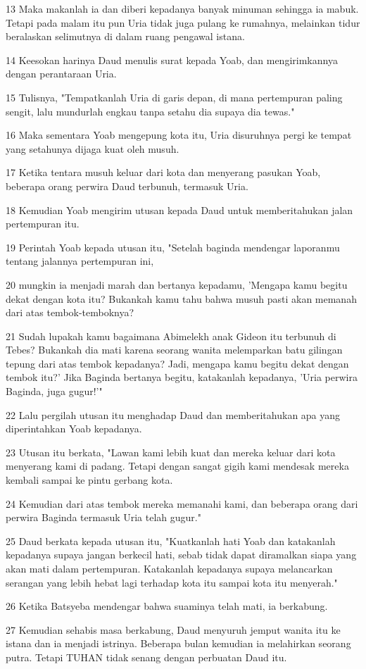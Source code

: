 \par 13 Maka makanlah ia dan diberi kepadanya banyak minuman sehingga ia mabuk. Tetapi pada malam itu pun Uria tidak juga pulang ke rumahnya, melainkan tidur beralaskan selimutnya di dalam ruang pengawal istana.
\par 14 Keesokan harinya Daud menulis surat kepada Yoab, dan mengirimkannya dengan perantaraan Uria.
\par 15 Tulisnya, "Tempatkanlah Uria di garis depan, di mana pertempuran paling sengit, lalu mundurlah engkau tanpa setahu dia supaya dia tewas."
\par 16 Maka sementara Yoab mengepung kota itu, Uria disuruhnya pergi ke tempat yang setahunya dijaga kuat oleh musuh.
\par 17 Ketika tentara musuh keluar dari kota dan menyerang pasukan Yoab, beberapa orang perwira Daud terbunuh, termasuk Uria.
\par 18 Kemudian Yoab mengirim utusan kepada Daud untuk memberitahukan jalan pertempuran itu.
\par 19 Perintah Yoab kepada utusan itu, "Setelah baginda mendengar laporanmu tentang jalannya pertempuran ini,
\par 20 mungkin ia menjadi marah dan bertanya kepadamu, 'Mengapa kamu begitu dekat dengan kota itu? Bukankah kamu tahu bahwa musuh pasti akan memanah dari atas tembok-temboknya?
\par 21 Sudah lupakah kamu bagaimana Abimelekh anak Gideon itu terbunuh di Tebes? Bukankah dia mati karena seorang wanita melemparkan batu gilingan tepung dari atas tembok kepadanya? Jadi, mengapa kamu begitu dekat dengan tembok itu?' Jika Baginda bertanya begitu, katakanlah kepadanya, 'Uria perwira Baginda, juga gugur!'"
\par 22 Lalu pergilah utusan itu menghadap Daud dan memberitahukan apa yang diperintahkan Yoab kepadanya.
\par 23 Utusan itu berkata, "Lawan kami lebih kuat dan mereka keluar dari kota menyerang kami di padang. Tetapi dengan sangat gigih kami mendesak mereka kembali sampai ke pintu gerbang kota.
\par 24 Kemudian dari atas tembok mereka memanahi kami, dan beberapa orang dari perwira Baginda termasuk Uria telah gugur."
\par 25 Daud berkata kepada utusan itu, "Kuatkanlah hati Yoab dan katakanlah kepadanya supaya jangan berkecil hati, sebab tidak dapat diramalkan siapa yang akan mati dalam pertempuran. Katakanlah kepadanya supaya melancarkan serangan yang lebih hebat lagi terhadap kota itu sampai kota itu menyerah."
\par 26 Ketika Batsyeba mendengar bahwa suaminya telah mati, ia berkabung.
\par 27 Kemudian sehabis masa berkabung, Daud menyuruh jemput wanita itu ke istana dan ia menjadi istrinya. Beberapa bulan kemudian ia melahirkan seorang putra. Tetapi TUHAN tidak senang dengan perbuatan Daud itu.

